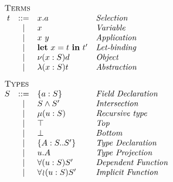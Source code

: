 \begin{minipage}[t]{.5\textwidth}\[\begin{array}{r c l l}
    \multicolumn{4}{l}{\textsc{Terms}}                      \\
    t & ::= & x.a             & \textit{Selection         } \\
      &  |  & x               & \textit{Variable          } \\
      &  |  & x\ y            & \textit{Application       } \\
      &  |  & \LET{x}{t}{t'}  & \textit{Let-binding       } \\
      &  |  & \OBJ{x}{S}{d}   & \textit{Object            } \\
      &  |  & \ABS{x}{S}{t}   & \textit{Abstraction       } \\[3mm]
    \multicolumn{4}{l}{\textsc{Types}}                      \\
    S & ::= & \FDEC{a}{S}     & \textit{Field Declaration } \\
      &  |  & \AGG{S}{S'}     & \textit{Intersection      } \\
      &  |  & \REC{u}{S}      & \textit{Recursive type    } \\
      &  |  & \top            & \textit{Top               } \\
      &  |  & \bot            & \textit{Bottom            } \\
      &  |  & \TDEC{A}{S}{S'} & \textit{Type Declaration  } \\
      &  |  & u.A             & \textit{Type Projection   } \\
      &  |  & \DFUN{u}{S}{S'} & \textit{Dependent Function} \\
      &  |  & \IFUN{u}{S}{S'} & \textit{Implicit Function } \\[3mm]
\end{array}\]\end{minipage}
